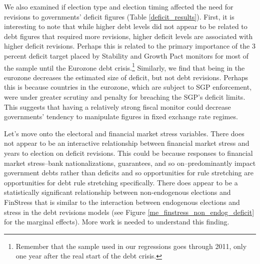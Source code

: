 \documentclass[]{article}
\begin{document}
We also examined if election type and election timing affected the need for revisions to governments' deficit figures (Table \ref{deficit_results}). First, it is interesting to note that while higher debt levels did not appear to be related to debt figures that required more revisions, higher deficit levels are associated with higher deficit revisions. Perhaps this is related to the primary importance of the 3 percent deficit target placed by Stability and Growth Pact monitors for most of the sample until the Eurozone debt crisis.\footnote{Remember that the sample used in our regressions goes through 2011, only one year after the real start of the debt crisis.} Similarly, we find that being in the eurozone decreases the estimated size of deficit, but not debt revisions. Perhaps this is because countries in the eurozone, which are subject to SGP enforcement, were under greater scrutiny and penalty for breaching the SGP's deficit limits. This suggests that having a relatively strong fiscal monitor could decrease governments' tendency to manipulate figures in fixed exchange rate regimes.

Let's move onto the electoral and financial market stress variables. There does not appear to be an interactive relationship between financial market stress and years to election on deficit revisions. This could be because responses to financial market stress--bank nationalizations, guarantees, and so on--predominantly impact government debts rather than deficits and so opportunities for rule stretching are opportunities for debt rule stretching specifically. There does appear to be a statistically significant relationship between non-endogenous elections and FinStress that is similar to the interaction between endogenous elections and stress in the debt revisions models (see Figure \ref{me_finstress_non_endog_deficit} for the marginal effects). More work is needed to understand this finding.

\begin{landscape}
    
\end{landscape}

\begin{landscape}
    
\end{landscape}
\end{document}
